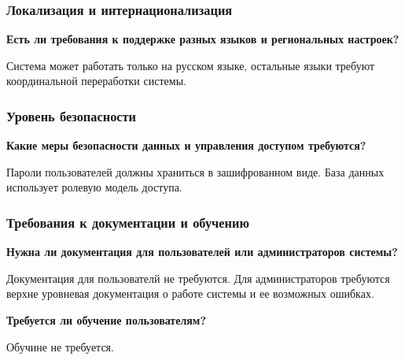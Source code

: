 \subsubsection{Локализация и интернационализация}
\textbf{Есть ли требования к поддержке разных языков и региональных настроек?} \par
Система может работать только на русском языке, остальные языки требуют координальной переработки системы.

\subsubsection{Уровень безопасности}
\textbf{Какие меры безопасности данных и управления доступом требуются?} \par
Пароли пользователей должны храниться в зашифрованном виде.
База данных использует ролевую модель доступа.

\subsubsection{Требования к документации и обучению}
\textbf{Нужна ли документация для пользователей или администраторов системы?} \par
Документация для пользователй не требуются.
Для администраторов требуются верхне уровневая документация о работе системы и ее возможных ошибках.
\par
\textbf{Требуется ли обучение пользователям?} \par
Обучине не требуется.

